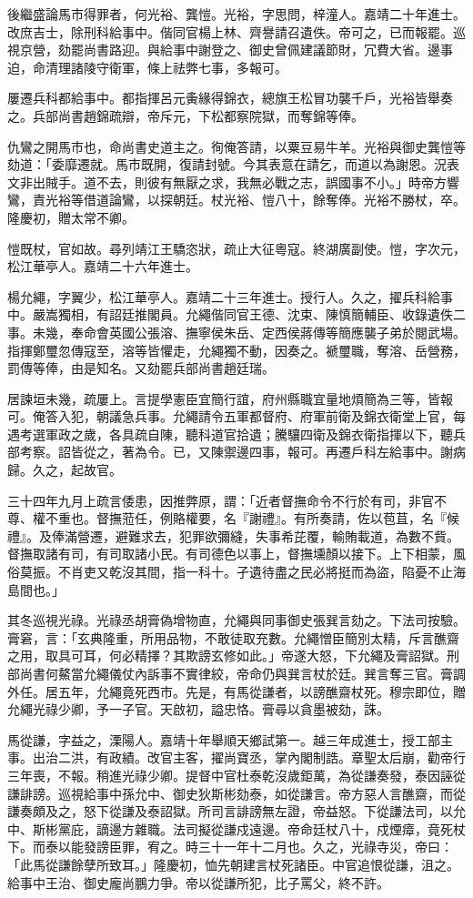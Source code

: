 \begin{pinyinscope}
{{後繼盛論馬市得罪者，何光裕、龔愷。光裕，字思問，梓潼人。嘉靖二十年進士。改庶吉士，除刑科給事中。偕同官楊上林、齊譽請召遺佚。帝可之，已而報罷。巡視京營，劾罷尚書路迎。與給事中謝登之、御史曾佩建議節財，冗費大省。邊事迫，命清理諸陵守衛軍，條上祛弊七事，多報可。

屢遷兵科都給事中。都指揮呂元夤緣得錦衣，總旗王松冒功襲千戶，光裕皆舉奏之。兵部尚書趙錦疏辯，帝斥元，下松都察院獄，而奪錦等俸。

仇鸞之開馬市也，命尚書史道主之。徇俺答請，以粟豆易牛羊。光裕與御史龔愷等劾道：「委靡遷就。馬市既開，復請封號。今其表意在請乞，而道以為謝恩。況表文非出賊手。道不去，則彼有無厭之求，我無必戰之志，誤國事不小。」時帝方響鸞，責光裕等借道論鸞，以探朝廷。杖光裕、愷八十，餘奪俸。光裕不勝杖，卒。隆慶初，贈太常不卿。

愷既杖，官如故。尋列靖江王驕恣狀，疏止大征粵寇。終湖廣副使。愷，字次元，松江華亭人。嘉靖二十六年進士。

楊允繩，字翼少，松江華亭人。嘉靖二十三年進士。授行人。久之，擢兵科給事中。嚴嵩獨相，有詔廷推閣員。允繩偕同官王德、沈束、陳慎簡輔臣、收錄遺佚二事。未幾，奉命會英國公張溶、撫寧侯朱岳、定西侯蔣傳等簡應襲子弟於閱武場。指揮鄭璽忽傳寇至，溶等皆懼走，允繩獨不動，因奏之。褫璽職，奪溶、岳營務，罰傳等俸，由是知名。又劾罷兵部尚書趙廷瑞。

居諫垣未幾，疏屢上。言提學憲臣宜簡行誼，府州縣職宜量地煩簡為三等，皆報可。俺答入犯，朝議急兵事。允繩請令五軍都督府、府軍前衛及錦衣衛堂上官，每遇考選軍政之歲，各具疏自陳，聽科道官拾遺；騰驤四衛及錦衣衛指揮以下，聽兵部考察。詔皆從之，著為令。已，又陳禦邊四事，報可。再遷戶科左給事中。謝病歸。久之，起故官。

三十四年九月上疏言倭患，因推弊原，謂：「近者督撫命令不行於有司，非官不尊、權不重也。督撫蒞任，例賂權要，名『謝禮』。有所奏請，佐以苞苴，名『候禮』。及俸滿營遷，避難求去，犯罪欲彌縫，失事希芘覆，輸賄載道，為數不貲。督撫取諸有司，有司取諸小民。有司德色以事上，督撫壎顏以接下。上下相蒙，風俗莫振。不肖吏又乾沒其間，指一科十。孑遺待盡之民必將挺而為盜，陷憂不止海島間也。」

其冬巡視光祿。光祿丞胡膏偽增物直，允繩與同事御史張巽言劾之。下法司按驗。膏窘，言：「玄典隆重，所用品物，不敢徒取充數。允繩憎臣簡別太精，斥言醮齋之用，取具可耳，何必精擇？其欺謗玄修如此。」帝遂大怒，下允繩及膏詔獄。刑部尚書何鰲當允繩儀仗內訴事不實律絞，帝命仍與巽言杖於廷。巽言奪三官。膏調外任。居五年，允繩竟死西市。先是，有馬從謙者，以謗醮齋杖死。穆宗即位，贈允繩光祿少卿，予一子官。天啟初，謚忠恪。膏尋以貪墨被劾，誅。

馬從謙，字益之，溧陽人。嘉靖十年舉順天鄉試第一。越三年成進士，授工部主事。出治二洪，有政績。改官主客，擢尚寶丞，掌內閣制誥。章聖太后崩，勸帝行三年喪，不報。稍進光祿少卿。提督中官杜泰乾沒歲鉅萬，為從謙奏發，泰因誣從謙誹謗。巡視給事中孫允中、御史狄斯彬劾泰，如從謙言。帝方惡人言醮齋，而從謙奏頗及之，怒下從謙及泰詔獄。所司言誹謗無左證，帝益怒。下從謙法司，以允中、斯彬黨庇，謫邊方雜職。法司擬從謙戍遠邊。帝命廷杖八十，戍煙瘴，竟死杖下。而泰以能發謗臣罪，宥之。時三十一年十二月也。久之，光祿寺災，帝曰：「此馬從謙餘孽所致耳。」隆慶初，恤先朝建言杖死諸臣。中官追恨從謙，沮之。給事中王治、御史龐尚鵬力爭。帝以從謙所犯，比子罵父，終不許。

}}
\end{pinyinscope}
